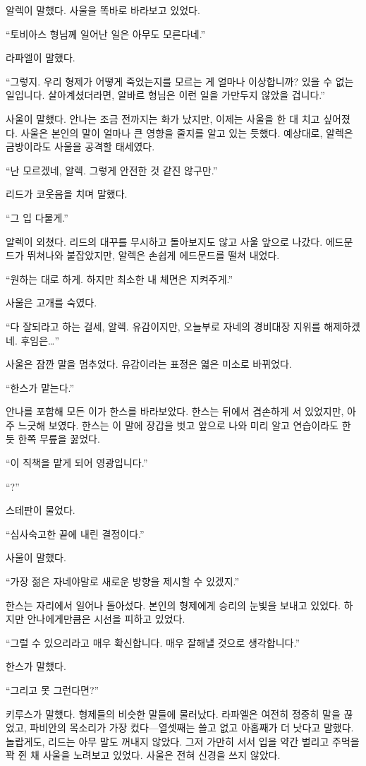알렉이 말했다. 사울을 똑바로 바라보고 있었다.

``토비아스 형님께 일어난 일은 아무도 모른다네.''

라파엘이 말했다.

``그렇지. 우리 형제가 어떻게 죽었는지를 모르는 게 얼마나 이상합니까? 있을 수 없는 일입니다. 살아계셨더라면, 알바르 형님은 이런 일을 가만두지 않았을 겁니다.''

사울이 말했다. 안나는 조금 전까지는 화가 났지만, 이제는 사울을 한 대 치고 싶어졌다. 사울은 본인의 말이 얼마나 큰 영향을 줄지를 알고 있는 듯했다. 예상대로, 알렉은 금방이라도 사울을 공격할 태세였다.

``난 모르겠네, 알렉. 그렇게 안전한 것 같진 않구만.''

리드가 코웃음을 치며 말했다.

``그 입 다물게.''

알렉이 외쳤다. 리드의 대꾸를 무시하고 돌아보지도 않고 사울 앞으로 나갔다. 에드문드가 뛰쳐나와 붙잡았지만, 알렉은 손쉽게 에드문드를 떨쳐 내었다.

``원하는 대로 하게. 하지만 최소한 내 체면은 지켜주게.''

사울은 고개를 숙였다.

``다 잘되라고 하는 걸세, 알렉. 유감이지만, 오늘부로 자네의 경비대장 지위를 해제하겠네. 후임은\ldots''

사울은 잠깐 말을 멈추었다. 유감이라는 표정은 엷은 미소로 바뀌었다.

``한스가 맡는다.''

안나를 포함해 모든 이가 한스를 바라보았다. 한스는 뒤에서 겸손하게 서 있었지만, 아주 느긋해 보였다. 한스는 이 말에 장갑을 벗고 앞으로 나와 미리 알고 연습이라도 한 듯 한쪽 무릎을 꿇었다.

``이 직책을 맡게 되어 영광입니다.''

``?''

스테판이 물었다.

``심사숙고한 끝에 내린 결정이다.''

사울이 말했다.

``가장 젊은 자네야말로 새로운 방향을 제시할 수 있겠지.''

한스는 자리에서 일어나 돌아섰다. 본인의 형제에게 승리의 눈빛을 보내고 있었다. 하지만 안나에게만큼은 시선을 피하고 있었다.

``그럴 수 있으리라고 매우 확신합니다. 매우 잘해낼 것으로 생각합니다.''

한스가 말했다.

``그리고 못 그런다면?''

키루스가 말했다. 형제들의 비슷한 말들에 물러났다. 라파엘은 여전히 정중히 말을 끊었고, 파비안의 목소리가 가장 컸다—열셋째는 쓸고 없고 아홉째가 더 낫다고 말했다. 놀랍게도, 리드는 아무 말도 꺼내지 않았다. 그저 가만히 서서 입을 약간 벌리고 주먹을 꽉 쥔 채 사울을 노려보고 있었다. 사울은 전혀 신경을 쓰지 않았다.

